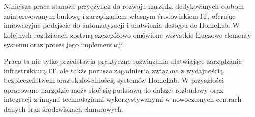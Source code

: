 Niniejsza praca stanowi przyczynek do rozwoju narzędzi dedykowanych osobom zainteresowanym budową i zarządzaniem własnym środowiskiem IT, oferując innowacyjne podejście do automatyzacji i ułatwienia dostępu do HomeLab. W kolejnych rozdziałach zostaną szczegółowo omówione wszystkie kluczowe elementy systemu oraz proces jego implementacji. 

Praca ta nie tylko przedstawia praktyczne rozwiązania ułatwiające zarządzanie infrastrukturą IT, ale także porusza zagadnienia związane z wydajnością, bezpieczeństwem oraz skalowalnością systemów HomeLab. W przyszłości opracowane narzędzie może stać się podstawą do dalszej rozbudowy oraz integracji z innymi technologiami wykorzystywanymi w nowoczesnych centrach danych oraz środowiskach chmurowych.

